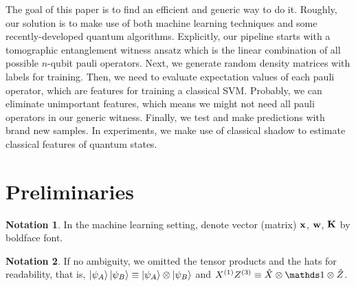 \documentclass[
reprint,
aps,
pra,
floatfix,
]{revtex4-2}
\theoremstyle{plain}
\theoremstyle{definition}
\newtheorem{notation}{Notation}
\newcommand{\ew}{W}
\newcommand{\ob}{O}
\newcommand{\dm}{\rho}
\newcommand{\px}{X}
\newcommand{\pz}{Z}
\newcommand{\hamiltonian}{\hat{H}}
\begin{document}
The goal of this paper is to find an efficient and generic way to do it. Roughly, our solution is to make use of both machine learning techniques and some recently-developed quantum algorithms.
Explicitly, our pipeline starts with a tomographic entanglement witness ansatz which is the linear combination of all possible $n$-qubit pauli operators. 
Next, we generate random density matrices with labels for training. 
Then, we need to evaluate expectation values of each pauli operator, which are features for training a classical SVM. 
Probably, we can eliminate unimportant features, which means we might not need all pauli operators in our generic witness. 
Finally, we test and make predictions with brand new samples. 
In experiments, we make use of classical shadow \cite{huangPredictingManyProperties2020} to estimate classical features of quantum states.

\section{Preliminaries}
\begin{notation}
	In the machine learning setting,
	denote vector (matrix) $\vb{x}$, $\vb{w}$, $\vb{K}$ by boldface font.
\end{notation}
\begin{notation}
	If no ambiguity,
	we omitted the tensor products and the hats for readability,
	that is,
	$\ket{\psi_A}\ket{\psi_B}\equiv \ket{\psi_A}\otimes \ket{\psi_B}$ 
	and $\px^{(1)}\pz^{(3)} \equiv \hat{X} \otimes \identity \otimes \hat{Z}$.
\end{notation}
\end{document}
